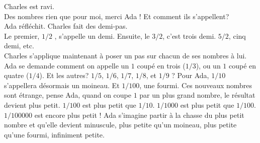 Charles est ravi.\\
\guillemotleft Des nombres rien que pour moi, merci Ada ! Et comment ils s’appellent? \guillemotright \\
Ada réfléchit. Charles fait des demi-pas. \\
\guillemotleft Le premier, $1/2$ , s’appelle un demi. Ensuite, le $3/2$, c’est trois demi. $5/2$, cinq demi, etc. \guillemotright \\
Charles s’applique maintenant à poser un pas sur chacun de ses nombres à lui.
Ada se demande comment on appelle un $1$ coupé en trois ($1/3$), ou un $1$ coupé en quatre ($1/4$). Et les autres? $1/5$, $1/6$, $1/7$, $1/8$, et $1/9$ ? Pour Ada, $1/10$ s’appellera désormais un moineau. Et $1/100$, une fourmi. 
Ces nouveaux nombres sont étrange, pense Ada, quand on coupe $1$ par un plus grand nombre, le résultat devient plus petit.
$1/100$ est plus petit que $1/10$. $1/1000$ est plus petit que $1/100$. $1/100000$ est encore plus petit ! Ada s’imagine partir à la chasse du plus petit nombre et qu'elle devient minuscule, plus petite qu’un moineau, plus petite qu'une fourmi, infiniment petite.
